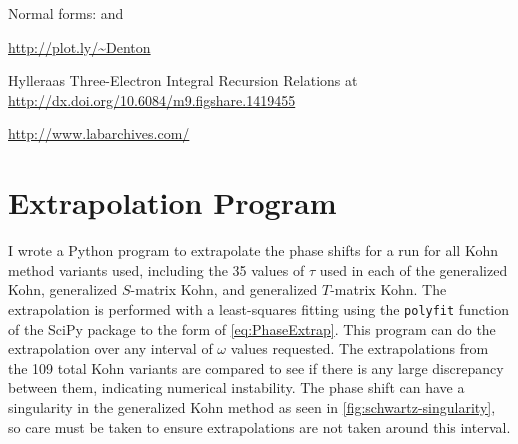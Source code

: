\documentclass[Dissertation.tex]{subfiles}
\begin{document}
Normal forms:
\cite{Phlonx} and \cite{Kent1983}


\url{http://plot.ly/~Denton}



Hylleraas Three-Electron Integral Recursion Relations at \url{http://dx.doi.org/10.6084/m9.figshare.1419455}

\url{http://www.labarchives.com/}





\section{Extrapolation Program}
I wrote a Python \cite{Python} program to extrapolate the phase shifts for a 
run for all Kohn method variants used, including the 35 values of $\tau$ used 
in each of the generalized Kohn, generalized $S$-matrix Kohn, and generalized
$T$-matrix Kohn. The extrapolation is performed with a least-squares fitting 
using the \texttt{polyfit} function of the SciPy package \cite{SciPy} to the 
form of \cref{eq:PhaseExtrap}. This program can do the extrapolation over any 
interval of $\omega$ values requested. The extrapolations from the 109 total 
Kohn variants are compared to see if there is any large discrepancy between 
them, indicating numerical instability. The phase shift can have a 
singularity in the generalized Kohn method as seen in \cref{fig:schwartz-singularity}, so 
care must be taken to ensure extrapolations are not taken around this interval.


\biblio
\end{document}

